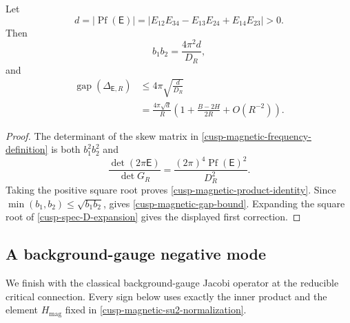 \begin{corollary}
\label{cusp-magnetic-frequency-product}
Let
\[
 d=|\operatorname{Pf}(\mathsf E)|
 =\lvert E_{12}E_{34}-E_{13}E_{24}+E_{14}E_{23}\rvert>0.
\]
Then
\begin{equation}
 b_1b_2=\frac{4\pi^2d}{D_R},
 \label{cusp-magnetic-product-identity}
\end{equation}
and
\begin{align}
 \operatorname{gap}(\Delta_{\mathsf E,R})
 &\le 4\pi\sqrt{\frac d{D_R}}
 \label{cusp-magnetic-gap-bound}\\
 &=\frac{4\pi\sqrt d}{R}
 \left(1+\frac{B-2H}{2R}
 +O(R^{-2})\right).
 \nonumber
\end{align}
\end{corollary}

\begin{proof}
The determinant of the skew matrix in
\eqref{cusp-magnetic-frequency-definition} is both
\(b_1^2b_2^2\) and
\[
 \frac{\det(2\pi\mathsf E)}{\det G_R}
 =\frac{(2\pi)^4\operatorname{Pf}(\mathsf E)^2}{D_R^2}.
\]
Taking the positive square root proves
\eqref{cusp-magnetic-product-identity}.  Since
\(\min(b_1,b_2)\le\sqrt{b_1b_2}\),
 gives
\eqref{cusp-magnetic-gap-bound}.  Expanding the square root of
\cref{cusp-spec-D-expansion} gives the displayed first correction.
\end{proof}

\subsection{A background-gauge negative mode}

We finish with the classical background-gauge Jacobi operator at the
reducible critical connection.  Every sign below uses exactly the inner
product and the element \(H_{\mathrm{mag}}\) fixed in
\cref{cusp-magnetic-su2-normalization}.

